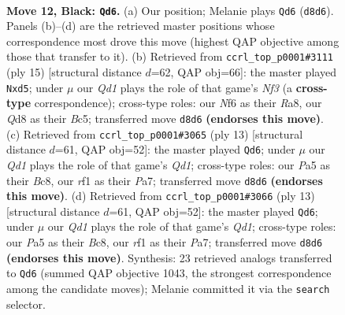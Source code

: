 \documentclass[11pt]{article}
\begin{document}
\clearpage

\begin{figure}[p]\centering
\begin{subfigure}{0.46\textwidth}\centering
\resizebox{\linewidth}{!}{%
\newchessgame
\chessboard[
  setfen={rnbq1rk1/1p2bppp/4pn2/p7/P1PN1P1P/6P1/4P1B1/RNBQ1RK1 b - - 0 12},
  showmover=false,
  pgfstyle=straightmove, color=movearrow, markmove={d8-d6}
]}
\caption{}
\end{subfigure}\hfill
\begin{subfigure}{0.46\textwidth}\centering
\resizebox{\linewidth}{!}{%
\newchessgame
\chessboard[
  setfen={rnbq1rk1/pp3ppp/4pn2/2bP4/3N4/6P1/PP2PPBP/RNBQ1RK1 b - - 0 8},
  showmover=false,
  pgfstyle=straightmove, color=movearrow, markmove={f6-d5}
]}
\caption{}
\end{subfigure}
\\[4pt]
\begin{subfigure}{0.46\textwidth}\centering
\resizebox{\linewidth}{!}{%
\newchessgame
\chessboard[
  setfen={rnbq1rk1/ppp1bppp/4pn2/4N3/2pP4/6P1/PP2PPBP/RNBQ1RK1 b - - 1 7},
  showmover=false,
  pgfstyle=straightmove, color=movearrow, markmove={d8-d6}
]}
\caption{}
\end{subfigure}\hfill
\begin{subfigure}{0.46\textwidth}\centering
\resizebox{\linewidth}{!}{%
\newchessgame
\chessboard[
  setfen={rnbq1rk1/ppp1bppp/4pn2/4N3/2pP4/6P1/PP2PPBP/RNBQ1RK1 b - - 1 7},
  showmover=false,
  pgfstyle=straightmove, color=movearrow, markmove={d8-d6}
]}
\caption{}
\end{subfigure}
\caption{\textbf{Move 12, Black: \texttt{Qd6}.} (a) Our position; Melanie plays \texttt{Qd6} (\texttt{d8d6}). Panels (b)--(d) are the retrieved master positions whose correspondence most drove this move (highest QAP objective among those that transfer to it). (b) Retrieved from \texttt{ccrl\_top\_p0001\#3111} (ply 15) [structural distance $d$=62, QAP obj=66]: the master played \texttt{Nxd5}; under $\mu$ our \emph{Qd1} plays the role of that game's \emph{Nf3} (a \textbf{cross-type} correspondence); cross-type roles: our \emph{N}f6 as their \emph{R}a8, our \emph{Q}d8 as their \emph{B}c5; transferred move \texttt{d8d6} \textbf{(endorses this move)}. (c) Retrieved from \texttt{ccrl\_top\_p0001\#3065} (ply 13) [structural distance $d$=61, QAP obj=52]: the master played \texttt{Qd6}; under $\mu$ our \emph{Qd1} plays the role of that game's \emph{Qd1}; cross-type roles: our \emph{P}a5 as their \emph{B}c8, our \emph{r}f1 as their \emph{P}a7; transferred move \texttt{d8d6} \textbf{(endorses this move)}. (d) Retrieved from \texttt{ccrl\_top\_p0001\#3066} (ply 13) [structural distance $d$=61, QAP obj=52]: the master played \texttt{Qd6}; under $\mu$ our \emph{Qd1} plays the role of that game's \emph{Qd1}; cross-type roles: our \emph{P}a5 as their \emph{B}c8, our \emph{r}f1 as their \emph{P}a7; transferred move \texttt{d8d6} \textbf{(endorses this move)}. Synthesis: 23 retrieved analogs transferred to \texttt{Qd6} (summed QAP objective 1043, the strongest correspondence among the candidate moves); Melanie committed it via the \texttt{search} selector.}
\label{fig:thought-m23}
\end{figure}
\end{document}
